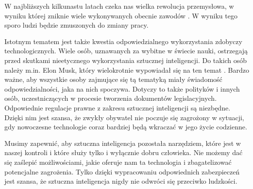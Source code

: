 W najbliższych kilkunastu latach czeka nas wielka rewolucja przemysłowa, w wyniku której zniknie wiele wykonywanych obecnie zawodów \cite{czwartaRewolucja:artykul}. W wyniku tego sporo ludzi będzie zmuszonych do zmiany pracy.

Istotnym tematem jest także kwestia odpowiedzialnego wykorzystania zdobyczy technologicznych. Wiele osób, uznawanych za wybitne w świecie nauki, ostrzegają przed skutkami nieetycznego wykorzystania sztucznej inteligencji. Do takich osób należy m.in. Elon Musk, który wielokrotnie wypowiadał się na ten temat \cite{elonMusk:sztucznaInteligencja}. Bardzo ważne, aby wszystkie osoby zajmujące się tą tematyką miały świadomość odpowiedzialności, jaka na nich spoczywa. Dotyczy to także polityków i innych osób, uczestniczących w procesie tworzenia dokumentów legislacyjnych. Odpowiednie regulacje prawne z zakresu sztucznej inteligencji są niezbędne. Dzięki nim jest szansa, że zwykły obywatel nie poczuje się zagrożony w sytuacji, gdy nowoczesne technologie coraz bardziej będą wkraczać w jego życie codzienne.

Musimy zapewnić, aby sztuczna inteligencja pozostała narzędziem, które jest w naszej kontroli i które służy tylko i wyłącznie dobru człowieka. Nie możemy dać się zaślepić możliwościami, jakie oferuje nam ta technologia i zbagatelizować potencjalne zagrożenia. Tylko dzięki wypracowaniu odpowiednich zabezpieczeń jest szansa, że sztuczna inteligencja nigdy nie odwróci się przeciwko ludzkości.

\listoffigures